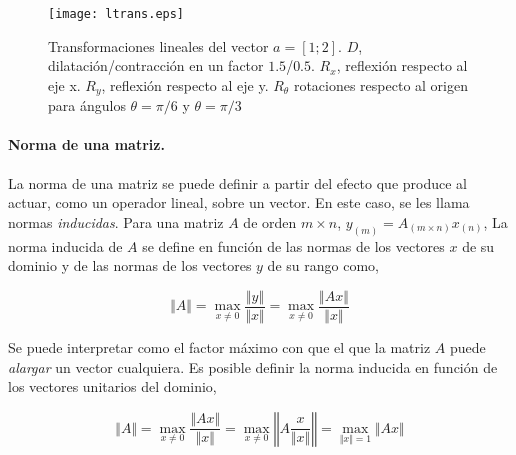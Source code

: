 \begin{figure}[h]
\centering
\texttt{[image: ltrans.eps]}
\caption{Transformaciones lineales del vector $a=[1;2]$. $D$, dilatación/contracción en un factor $1.5$/$0.5$. $R_x$, reflexión respecto al eje x. $R_y$, reflexión respecto al eje y. $R_{\theta}$ rotaciones respecto al origen para ángulos $\theta=\pi /6$ y $\theta=\pi /3$}
\label{fig:ltrans}
\end{figure}

\begin{paracol}{2}
\paragraph{Norma de una matriz.} La norma de una matriz se puede definir a partir del efecto que produce al actuar, como un operador lineal, sobre un vector. En este caso, se les llama normas \emph{inducidas}. Para una matriz $A$ de orden $m\times n$, $y_{(m)}=A_{(m\times n)}x_{(n)}$, La norma inducida de $A$ se define en función de las normas de los vectores $x$ de su dominio y de las normas de los vectores $y$ de su rango como,
\end{paracol}
\begin{equation*}
\Vert A \Vert =\max_{x \neq 0} \frac{\Vert y \Vert}{\Vert x \Vert}=\max_{x \neq 0} \frac{\Vert Ax \Vert}{\Vert x \Vert}
\end{equation*}

\begin{paracol}{2}
Se puede interpretar como el factor máximo con que el que la matriz $A$ puede \emph{alargar} un vector cualquiera. Es posible definir la norma inducida en función de los vectores unitarios del dominio,
\end{paracol}
\begin{equation*}
\Vert A \Vert =\max_{x \neq 0} \frac{\Vert Ax \Vert}{\Vert x \Vert}= \max_{x \neq 0} \left\Vert A\frac{x}{\Vert x \Vert} \right\Vert= \max_{\Vert x \Vert =1}\Vert Ax \Vert
\end{equation*}

